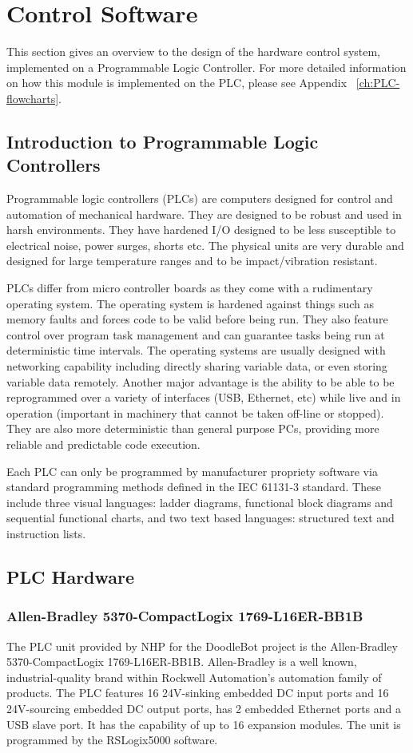 \section{Control Software}

This section gives an overview to the design of the hardware control system, implemented on a Programmable Logic Controller. For more detailed information on how this module is implemented on the PLC, please see Appendix ~\ref{ch:PLC-flowcharts}.

\subsection{Introduction to Programmable Logic Controllers}
	Programmable logic controllers (PLCs) are computers designed for control and automation of mechanical hardware. They are designed to be robust and used in harsh environments. They have hardened I/O designed to be less susceptible to electrical noise, power surges, shorts etc. The physical units are very durable and designed for large temperature ranges and to be impact/vibration resistant.
	
	PLCs differ from micro controller boards as they come with a rudimentary operating system. The operating system is hardened against things such as memory faults and forces code to be valid before being run. They also feature control over program task management and can guarantee tasks being run at deterministic time intervals. The operating systems are usually designed with networking capability including directly sharing variable data, or even storing variable data remotely. Another major advantage is the ability to be able to be reprogrammed over a variety of interfaces (USB, Ethernet, etc) while live and in operation (important in machinery that cannot be taken off-line or stopped). They are also more deterministic than general purpose PCs, providing more reliable and predictable code execution.
	
	Each PLC can only be programmed by manufacturer propriety software via standard programming methods defined in the IEC 61131-3 standard. These include three visual languages: ladder diagrams, functional block diagrams and sequential functional charts, and two text based languages: structured text and instruction lists.
	
\subsection{PLC Hardware}
	\subsubsection{Allen-Bradley 5370-CompactLogix 1769-L16ER-BB1B}
		The PLC unit provided by NHP for the DoodleBot project is the Allen-Bradley 5370-CompactLogix 1769-L16ER-BB1B. Allen-Bradley is a well known, industrial-quality brand within Rockwell Automation's automation family of products. The PLC features 16 24V-sinking embedded DC input ports and 16 24V-sourcing embedded DC output ports, has 2 embedded Ethernet ports and a USB slave port. It has the capability of up to 16 expansion modules. The unit is programmed by the RSLogix5000 software.

